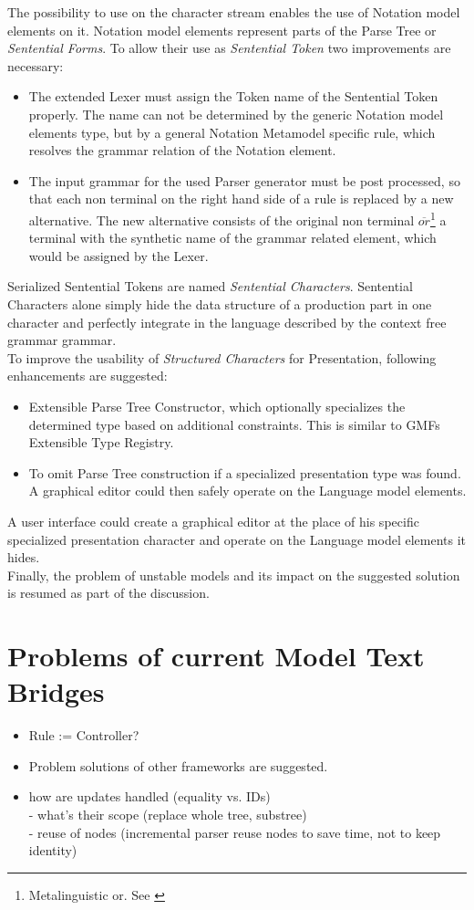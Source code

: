 The possibility to use  on the character stream enables the use of Notation model elements on it. Notation model elements represent parts of the Parse Tree or \emph{Sentential Forms}. To allow their use as \emph{Sentential Token} two improvements are necessary:
\begin{itemize}
	\item The extended Lexer must assign the Token name of the Sentential Token properly. The name can not be determined by the generic Notation model elements type, but by a general Notation Metamodel specific rule, which resolves the grammar relation of the Notation element.
	\item The input grammar for the used Parser generator must be post processed, so that each non terminal on the right hand side of a rule is replaced by a new alternative. The new alternative consists of the original non terminal $\overline{or}$\footnote{\raggedright Metalinguistic or. See \cite{BNF}} a terminal with the synthetic name of the grammar related element, which would be assigned by the Lexer.
\end{itemize}
Serialized Sentential Tokens are named \emph{Sentential Characters}. Sentential Characters alone simply hide the data structure of a production part in one character and perfectly integrate in the language described by the context free grammar grammar. \\

To improve the usability of \emph{Structured Characters} for Presentation, following enhancements are suggested:
\begin{itemize}
	\item Extensible Parse Tree Constructor, which optionally specializes the determined type based on additional constraints. This is similar to GMFs Extensible Type Registry.
	\item To omit Parse Tree construction if a specialized presentation type was found. A graphical editor could then safely operate on the Language model elements.
\end{itemize}
A user interface could create a graphical editor at the place of his specific specialized presentation character and operate on the Language model elements it hides.\\


Finally, the problem of unstable models and its impact on the suggested solution is resumed as part of the discussion.


\section{Problems of current Model Text Bridges}
\begin{itemize}
	\item Rule := Controller?
	\item Problem solutions of other frameworks are suggested.
\item how are updates handled (equality vs. IDs) \\
		- what's their scope (replace whole tree, substree) \\
		-	reuse of nodes (incremental parser reuse nodes to save time, not to keep identity)
\end{itemize}	

